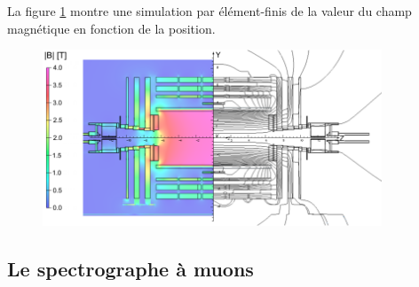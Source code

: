 \newpage
La figure \ref{CHAMP} montre une simulation par élément-finis de la valeur du champ magnétique en fonction de la position.
\begin{figure}[ht!]
	\centering
	\includegraphics[width=0.90\textwidth]{CMS/CHAMP.png}
	\label{CHAMP}
\end{figure}
\subsection{Le spectrographe à muons}


